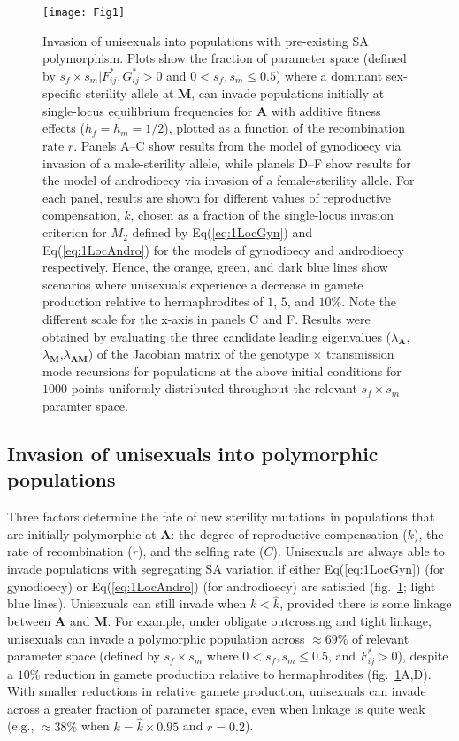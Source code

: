 \documentclass[9pt,twocolumn,twoside,lineno]{gsajnl}
\begin{document}
\begin{figure}[htbp]
\centering
\texttt{[image: Fig1]}
\caption{Invasion of unisexuals into populations with pre-existing SA polymorphism. Plots show the fraction of parameter space (defined by $s_f \times s_m | F^{\ast}_{ij},G^{\ast}_{ij} > 0$ and $0 < s_f,s_m \leq 0.5$) where a dominant sex-specific sterility allele at $\mathbf{M}$, can invade populations initially at single-locus equilibrium frequencies for $\mathbf{A}$ with additive fitness effects ($h_f=h_m=1/2$), plotted as a function of the recombination rate $r$. Panels A--C show results from the model of gynodioecy via invasion of a male-sterility allele, while planels D--F show results for the model of androdioecy via invasion of a female-sterility allele. For each panel, results are shown for different values of reproductive compensation, $k$, chosen as a fraction of the single-locus invasion criterion for $M_2$ defined by Eq(\ref{eq:1LocGyn}) and Eq(\ref{eq:1LocAndro}) for the models of gynodioecy and androdioecy respectively. Hence, the orange, green, and dark blue lines show scenarios where unisexuals experience a decrease in gamete production relative to hermaphrodites of $1$, $5$, and $10\%$. Note the different scale for the x-axis in panels C and F. Results were obtained by evaluating the three candidate leading eigenvalues ($\lambda_{\mathbf{A}}$,$\lambda_{\mathbf{M}}$,$\lambda_{\mathbf{AM}}$) of the Jacobian matrix of the genotype $\times$ transmission mode recursions for populations at the above initial conditions for $1000$ points uniformly distributed throughout the relevant $s_f \times s_m$ paramter space.}
\label{fig:PrInv}
\end{figure}

\subsection{Invasion of unisexuals into polymorphic populations}

Three factors determine the fate of new sterility mutations in populations that are initially polymorphic at $\mathbf{A}$: the degree of reproductive compensation ($k$), the rate of recombination ($r$), and the selfing rate ($C$). Unisexuals are always able to invade populations with segregating SA variation if either Eq(\ref{eq:1LocGyn}) (for gynodioecy) or Eq(\ref{eq:1LocAndro}) (for androdioecy) are satisfied (fig.~\ref{fig:PrInv}; light blue lines). Unisexuals can still invade when $k < \hat{k}$, provided there is some linkage between $\mathbf{A}$ and $\mathbf{M}$. For example, under obligate outcrossing and tight linkage, unisexuals can invade a polymorphic population across $\approx 69\%$ of relevant parameter space (defined by $s_f \times s_m$ where $0 < s_f,s_m \leq 0.5$, and $F^{\ast}_{ij} > 0$), despite a $10\%$ reduction in gamete production relative to hermaphrodites (fig.~\ref{fig:PrInv}A,D). With smaller reductions in relative gamete production, unisexuals can invade across a greater fraction of parameter space, even when linkage is quite weak (e.g., $\approx 38\%$ when $k = \hat{k} \times 0.95 $ and $r = 0.2$). 
\end{document}
